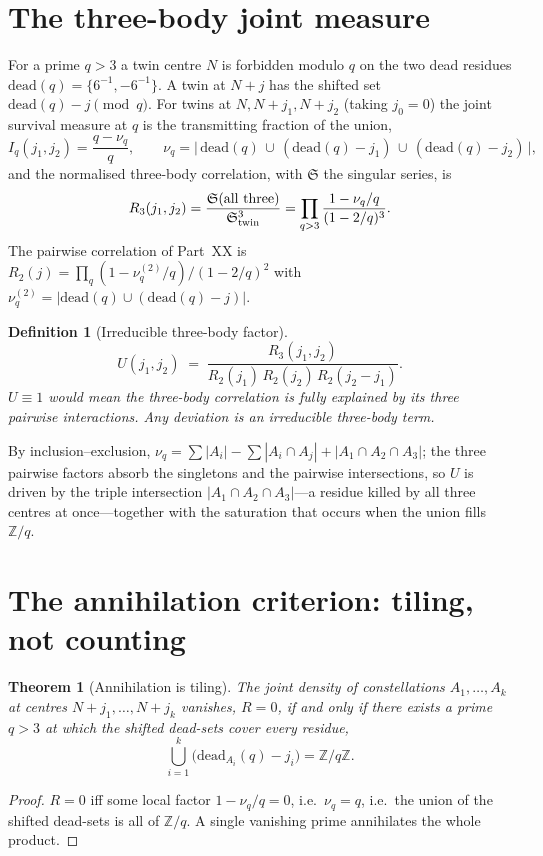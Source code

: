 \documentclass[11pt,a4paper]{article}
\newtheorem{theorem}{Theorem}
\newtheorem{definition}{Definition}
\begin{document}
\section{The three-body joint measure}
For a prime $q>3$ a twin centre $N$ is forbidden modulo $q$ on the two dead
residues $\mathrm{dead}(q)=\{6^{-1},-6^{-1}\}$. A twin at $N+j$ has the shifted set
$\mathrm{dead}(q)-j\pmod q$. For twins at $N,N+j_1,N+j_2$ (taking $j_0=0$) the
joint survival measure at $q$ is the transmitting fraction of the union,
\begin{equation}
  I_q(j_1,j_2)=\frac{q-\nu_q}{q},\qquad
  \nu_q=\Big|\,\mathrm{dead}(q)\,\cup\,(\mathrm{dead}(q)-j_1)\,\cup\,(\mathrm{dead}(q)-j_2)\,\Big|,
\end{equation}
and the normalised three-body correlation, with $\mathfrak{S}$ the singular series, is
\begin{equation}
  R_3(j_1,j_2)=\frac{\mathfrak{S}(\text{all three})}{\mathfrak{S}_{\rm twin}^3}
  =\prod_{q>3}\frac{1-\nu_q/q}{(1-2/q)^3}.
\end{equation}
The pairwise correlation of Part~XX is $R_2(j)=\prod_q (1-\nu_q^{(2)}/q)/(1-2/q)^2$
with $\nu_q^{(2)}=|\mathrm{dead}(q)\cup(\mathrm{dead}(q)-j)|$.

\begin{definition}[Irreducible three-body factor]
\begin{equation}
  U(j_1,j_2)\;=\;\frac{R_3(j_1,j_2)}{R_2(j_1)\,R_2(j_2)\,R_2(j_2-j_1)} .
\end{equation}
$U\equiv1$ would mean the three-body correlation is fully explained by its three
pairwise interactions. Any deviation is an irreducible three-body term.
\end{definition}

By inclusion--exclusion, $\nu_q=\sum|A_i|-\sum|A_i\cap A_j|+|A_1\cap A_2\cap A_3|$;
the three pairwise factors absorb the singletons and the pairwise intersections,
so $U$ is driven by the triple intersection $|A_1\cap A_2\cap A_3|$---a residue
killed by all three centres at once---together with the saturation that occurs
when the union fills $\mathbb{Z}/q$.

\section{The annihilation criterion: tiling, not counting}
\begin{theorem}[Annihilation is tiling]\label{thm:tile}
The joint density of constellations $A_1,\dots,A_k$ at centres $N+j_1,\dots,N+j_k$
vanishes, $R=0$, if and only if there exists a prime $q>3$ at which the shifted
dead-sets cover every residue,
\[
  \bigcup_{i=1}^{k}\big(\mathrm{dead}_{A_i}(q)-j_i\big)=\mathbb{Z}/q\mathbb{Z}.
\]
\end{theorem}
\begin{proof}
$R=0$ iff some local factor $1-\nu_q/q=0$, i.e.\ $\nu_q=q$, i.e.\ the union of the
shifted dead-sets is all of $\mathbb{Z}/q$. A single vanishing prime annihilates
the whole product.
\end{proof}
\end{document}
